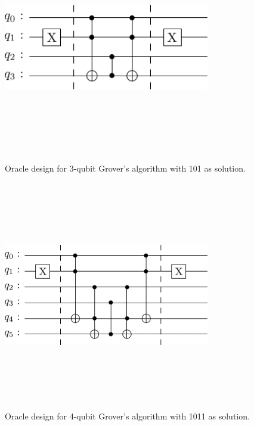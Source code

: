 \documentclass[conference]{IEEEtran}
\begin{document}
\begin{figure}[htbp]
	\centerline{\includegraphics[width=9cm,height=10cm,keepaspectratio]{3-qubit-101.png}}
	\caption{Oracle design for 3-qubit Grover’s algorithm with 101 as solution.}
	\label{fig5}
\end{figure}

\begin{figure}[htbp]
	\centerline{\includegraphics[width=9cm,height=10cm,keepaspectratio]{4-qubit-1011.png}}
	\caption{Oracle design for 4-qubit Grover’s algorithm with 1011 as solution.}
	\label{fig6}
\end{figure}
\end{document}
